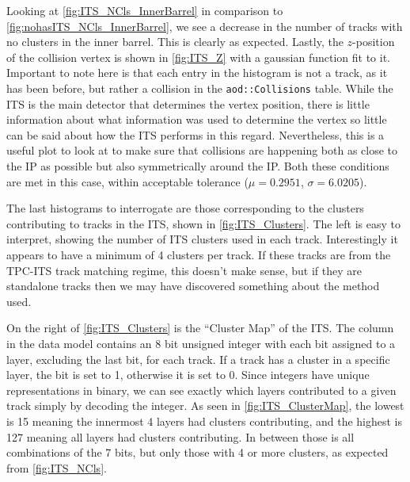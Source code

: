 Looking at \cref{fig:ITS_NCls_InnerBarrel} in comparison to \cref{fig:nohasITS_NCls_InnerBarrel}, we see a decrease in the number of tracks with no clusters in the inner barrel. This is clearly as expected. Lastly, the $z$-position of the collision vertex is shown in \cref{fig:ITS_Z} with a gaussian function fit to it. Important to note here is that each entry in the histogram is not a track, as it has been before, but rather a collision in the \texttt{aod::Collisions} table. While the ITS is the main detector that determines the vertex position, there is little information about what information was used to determine the vertex so little can be said about how the ITS performs in this regard. Nevertheless, this is a useful plot to look at to make sure that collisions are happening both as close to the IP as possible but also symmetrically around the IP. Both these conditions are met in this case, within acceptable tolerance ($\mu=0.2951$, $\sigma=6.0205$). 

\bigskip

The last histograms to interrogate are those corresponding to the clusters contributing to tracks in the ITS, shown in \cref{fig:ITS_Clusters}. The left is easy to interpret, showing the number of ITS clusters used in each track. Interestingly it appears to have a minimum of 4 clusters per track. If these tracks are from the TPC-ITS track matching regime, this doesn't make sense, but if they are standalone tracks then we may have discovered something about the method used.

On the right of \cref{fig:ITS_Clusters} is the ``Cluster Map'' of the ITS. The column in the data model contains an 8 bit unsigned integer with each bit assigned to a layer, excluding the last bit, for each track. If a track has a cluster in a specific layer, the bit is set to 1, otherwise it is set to 0. Since integers have unique representations in binary, we can see exactly which layers contributed to a given track simply by decoding the integer. As seen in \cref{fig:ITS_ClusterMap}, the lowest is 15 meaning the innermost 4 layers had clusters contributing, and the highest is 127 meaning all layers had clusters contributing. In between those is all combinations of the 7 bits, but only those with 4 or more clusters, as expected from \cref{fig:ITS_NCls}. 

